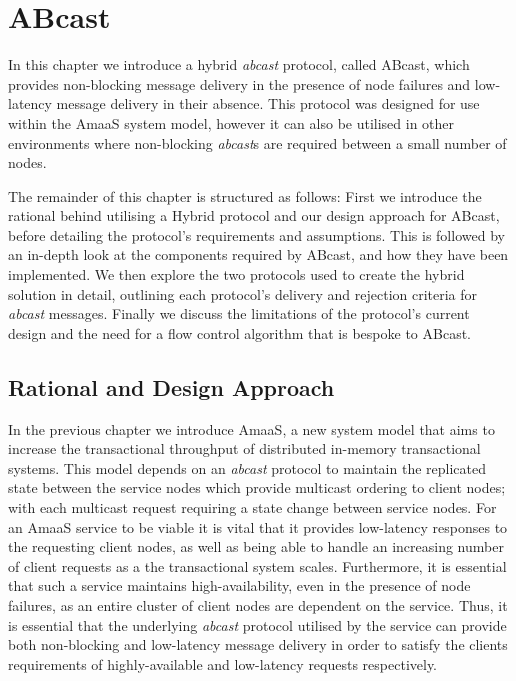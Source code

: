 \chapter{ABcast}

    \graphicspath{{Chapter4-ABcast/Figs/Vector/}{Chapter4-ABcast/Figs/}}

In this chapter we  introduce a hybrid \emph{abcast} protocol, called \textsf{ABcast}, which provides non-blocking message delivery in the presence of node failures and low-latency message delivery in their absence.  This protocol was designed for use within the \textsf{AmaaS} system model, however it can also be utilised in other environments where non-blocking \emph{abcast}s are required between a small number of nodes.  

The remainder of this chapter is structured as follows:  First we introduce the rational behind utilising a Hybrid protocol and our design approach for \textsf{ABcast}, before detailing the protocol's requirements and assumptions.  This is followed by an in-depth look at the components required by \textsf{ABcast}, and how they have been implemented.  We then explore the two protocols used to create the hybrid solution in detail, outlining each protocol's delivery and rejection criteria for \emph{abcast} messages. Finally we discuss the limitations of the protocol's current design and the need for a flow control algorithm that is bespoke to \textsf{ABcast}.  

\section{Rational and Design Approach}
    In the previous chapter we introduce \textsf{AmaaS}, a new system model that aims to increase the transactional throughput of distributed in-memory transactional systems.  This model depends on an \emph{abcast} protocol to maintain the replicated state between the service nodes which provide multicast ordering to client nodes; with each multicast request requiring a state change between service nodes.  For an \textsf{AmaaS} service to be viable it is vital that it provides low-latency responses to the requesting client nodes, as well as being able to handle an increasing number of client requests as a the transactional system scales.  Furthermore, it is essential that such a service maintains high-availability, even in the presence of node failures, as an entire cluster of client nodes are dependent on the service.  Thus, it is essential that the underlying \emph{abcast} protocol utilised by the service can provide both non-blocking and low-latency message delivery in order to satisfy the clients requirements of highly-available and low-latency requests respectively.  
    
